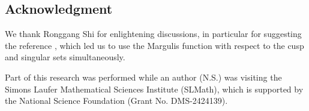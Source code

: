 \documentclass[12pt,reqno]{amsart}
\numberwithin{equation}{section}
\theoremstyle{plain}
\theoremstyle{definition}
\theoremstyle{remark}
\begin{document}
\subsection*{Acknowledgment} 
We thank Ronggang Shi for enlightening discussions, in particular for suggesting the reference \cite{PSS23}, which led us to use the Margulis function with respect to the cusp and singular sets simultaneously.

Part of this research was performed while an author (N.S.) was visiting the Simons Laufer Mathematical Sciences Institute (SLMath), which is supported by the National Science Foundation (Grant No. DMS-2424139). 

	
	
	
\end{document}
